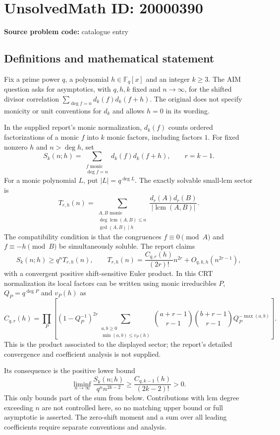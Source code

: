 \documentclass[11pt]{article}
\newcommand{\F}{\mathbb{F}}
\begin{document}
\section*{UnsolvedMath ID: 20000390}
\textbf{Source problem code:} catalogue entry
\subsection{Definitions and mathematical statement}
Fix a prime power $q$, a polynomial $h\in\F_q[x]$ and an integer $k\geq3$. The AIM question asks for asymptotics, with $q,h,k$ fixed and $n\to\infty$, for the shifted divisor correlation $\sum_{\deg f=n}d_k(f)d_k(f+h)$. The original does not specify monicity or unit conventions for $d_k$ and allows $h=0$ in its wording.

In the supplied report's monic normalization, $d_k(f)$ counts ordered factorizations of a monic $f$ into $k$ monic factors, including factors $1$. For fixed nonzero $h$ and $n>\deg h$, set
\[
 S_k(n;h)=\sum_{\substack{f\text{ monic}\\\deg f=n}}d_k(f)d_k(f+h),\qquad r=k-1.
\]
For a monic polynomial $L$, put $|L|=q^{\deg L}$. The exactly solvable small-lcm sector is
\[
 T_{r,h}(n)=\sum_{\substack{A,B\text{ monic}\\\deg\operatorname{lcm}(A,B)\leq n\\\gcd(A,B)\mid h}}
 \frac{d_r(A)d_r(B)}{|\operatorname{lcm}(A,B)|}.
\]
The compatibility condition is that the congruences $f\equiv0\pmod A$ and $f\equiv-h\pmod B$ be simultaneously soluble. The report claims
\[
 S_k(n;h)\geq q^n T_{r,h}(n),\qquad
 T_{r,h}(n)=\frac{C_{q,r}(h)}{(2r)!}n^{2r}+O_{q,k,h}(n^{2r-1}),
\]
with a convergent positive shift-sensitive Euler product. In this CRT normalization its local factors can be written using monic irreducibles $P$, $Q_P=q^{\deg P}$ and $v_P(h)$ as
\[
 C_{q,r}(h)=\prod_P\left[(1-Q_P^{-1})^{2r}
 \sum_{\substack{a,b\geq0\\\min(a,b)\leq v_P(h)}}
 \binom{a+r-1}{r-1}\binom{b+r-1}{r-1}Q_P^{-\max(a,b)}\right].
\]
This is the product associated to the displayed sector; the report's detailed convergence and coefficient analysis is not supplied.

Its consequence is the positive lower bound
\[
 \liminf_{n\to\infty}\frac{S_k(n;h)}{q^n n^{2k-2}}
 \geq\frac{C_{q,k-1}(h)}{(2k-2)!}>0.
\]
This only bounds part of the sum from below. Contributions with lcm degree exceeding $n$ are not controlled here, so no matching upper bound or full asymptotic is asserted. The zero-shift moment and a sum over all leading coefficients require separate conventions and analysis.
\end{document}
